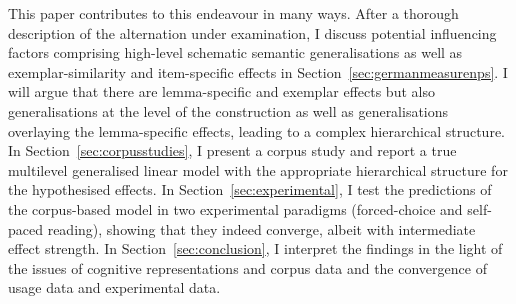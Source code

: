 This paper contributes to this endeavour in many ways.
After a thorough description of the alternation under examination, I discuss potential influencing factors comprising high-level schematic semantic generalisations as well as exemplar-similarity and item-specific effects in Section~\ref{sec:germanmeasurenps}.
I will argue that
there are lemma-specific and exemplar effects but also generalisations at the level of the construction as well as generalisations overlaying the lemma-specific effects, leading to a complex hierarchical structure.
In Section~\ref{sec:corpusstudies}, I present a corpus study and report a true multilevel generalised linear model with the appropriate hierarchical structure for the hypothesised effects.
In Section~\ref{sec:experimental}, I test the predictions of the corpus-based model in two experimental paradigms (forced-choice and self-paced reading), showing that they indeed converge, albeit with intermediate effect strength.
In Section~\ref{sec:conclusion}, I interpret the findings in the light of the issues of cognitive representations and corpus data and the convergence of usage data and experimental data.
